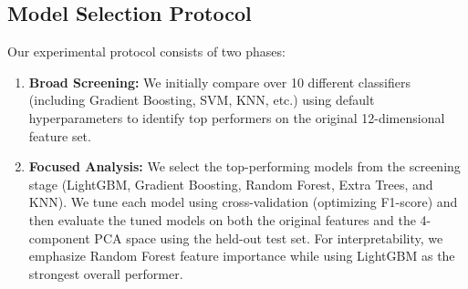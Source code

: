 \subsection{Model Selection Protocol}
Our experimental protocol consists of two phases:
\begin{enumerate}
    \item \textbf{Broad Screening:} We initially compare over 10 different classifiers (including Gradient Boosting, SVM, KNN, etc.) using default hyperparameters to identify top performers on the original 12-dimensional feature set.
    \item \textbf{Focused Analysis:} We select the top-performing models from the screening stage (LightGBM, Gradient Boosting, Random Forest, Extra Trees, and KNN). We tune each model using cross-validation (optimizing F1-score) and then evaluate the tuned models on both the original features and the 4-component PCA space using the held-out test set. For interpretability, we emphasize Random Forest feature importance while using LightGBM as the strongest overall performer.
\end{enumerate}
